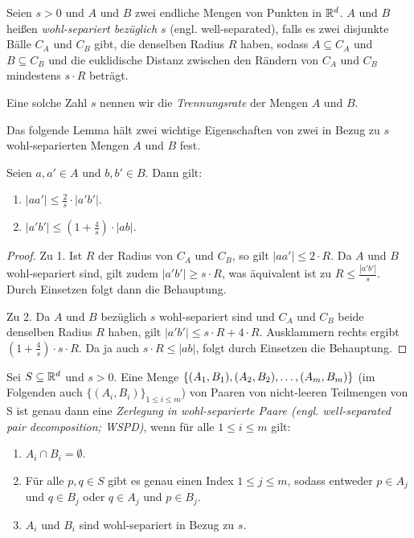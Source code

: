 \begin{definition}
   	\label{def:wellsep}
   	Seien $s > 0$ und $A$ und $B$ zwei endliche Mengen von Punkten in $\mathbb{R}^d$. 
   	$A$ und $B$ heißen \emph{wohl-separiert bezüglich $s$} (engl. well-separated), falls es zwei disjunkte Bälle $C_A$ und $C_B$ gibt, die denselben Radius $R$ haben, sodass $A \subseteq C_A$ und $B \subseteq C_B$ und die euklidische Distanz zwischen den Rändern von $C_A$ und $C_B$ mindestens $s\cdot R$ beträgt.

	Eine solche Zahl $s$ nennen wir die \emph{Trennungsrate} der Mengen $A$ und $B$.
\end{definition}

Das folgende Lemma hält zwei wichtige Eigenschaften von zwei in Bezug zu $s$ wohl-separierten Mengen $A$ und $B$ fest.
\begin{lemma}
   	\label{lem:wellsep}
	Seien $a, a' \in A$ und $b, b' \in B$. Dann gilt:
	\begin{enumerate}
		\item $\displaystyle |aa'| \leq \frac{2}{s}\cdot|a'b'|$.
		\item $\displaystyle |a'b'| \leq (1+\frac{4}{s})\cdot|ab|$.
	\end{enumerate}
\end{lemma}
\begin{proof}
   	Zu 1. Ist $R$ der Radius von $C_A$ und $C_B$, so gilt $|aa'| \leq 2 \cdot R$. Da $A$ und $B$ wohl-separiert sind, gilt zudem $|a'b'| \geq s \cdot R$, was äquivalent ist zu $R \leq \frac{|a'b'|}{s}$. Durch Einsetzen folgt dann die Behauptung.
   	
   	Zu 2. Da $A$ und $B$ bezüglich $s$ wohl-separiert sind und $C_A$ und $C_B$ beide denselben Radius $R$ haben, gilt $|a'b'| \leq s \cdot R + 4 \cdot R$. Ausklammern rechts ergibt $(1 + \frac{4}{s}) \cdot s \cdot R$. Da ja auch $s \cdot R \leq |ab|$, folgt durch Einsetzen die Behauptung.
\end{proof}

\begin{definition}[WSPD]
   	\label{def:wspd}
   	Sei $S \subseteq \mathbb{R}^d$ und $s > 0$. 
   	Eine Menge $ \{(A_1, B_1), (A_2, B_2), \mathellipsis, (A_m, B_m)\}$ (im Folgenden auch $\{(A_i, B_i)\}_{1 \leq i \leq m}$) von Paaren von nicht-leeren Teilmengen von S ist genau dann eine \emph{Zerlegung in wohl-separierte Paare (engl. well-separated pair decomposition; WSPD)}, wenn für alle $1 \leq i \leq m$ gilt:
   	\begin{enumerate}[label={(\arabic*)}, itemsep=0mm]
   		\item $A_i \cap B_i = \emptyset$.
   		\item Für alle $p, q \in S$ gibt es genau einen Index $1 \leq j \leq m$, sodass entweder $p \in A_j$ und $q \in B_j$ oder $q \in A_j$ und $p \in B_j$.
   		\item $A_i$ und $B_i$ sind wohl-separiert in Bezug zu $s$.
   	\end{enumerate}
\end{definition}

